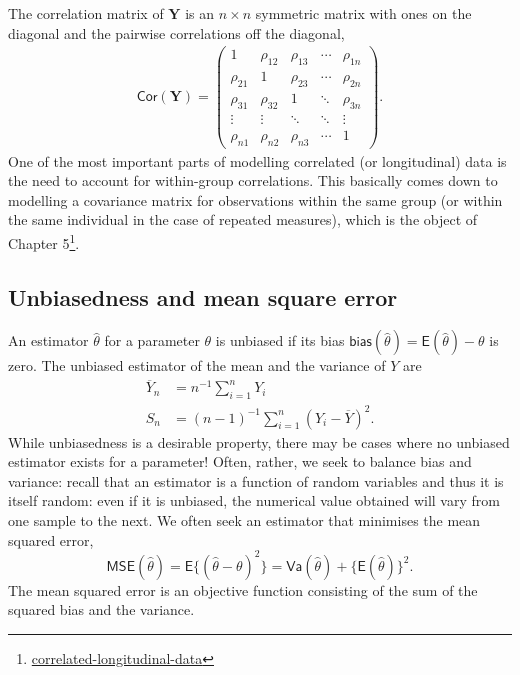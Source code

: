 \documentclass[
  11pt,
  letterpaper,
]{book}
\renewcommand{\href}[2]{#2\footnote{\url{#1}}}
\theoremstyle{definition}
\theoremstyle{definition}
\theoremstyle{definition}
\theoremstyle{remark}
\begin{document}
The correlation matrix of \(\boldsymbol{Y}\) is an
\(n\times n\) symmetric matrix with ones on the diagonal and the pairwise correlations off the diagonal,
\begin{align*}
\mathsf{Cor}(\boldsymbol{Y})=
\begin{pmatrix}
1 & \rho_{12} & \rho_{13} & \cdots & \rho_{1n}\\
\rho_{21} & 1 & \rho_{23} & \cdots & \rho_{2n} \\
\rho_{31} & \rho_{32} & 1 & \ddots & \rho_{3n} \\
\vdots & \vdots & \ddots & \ddots & \vdots \\
\rho_{n1} & \rho_{n2} & \rho_{n3} & \cdots & 1
\end{pmatrix}.
\end{align*}
One of the most important parts of modelling
correlated (or longitudinal) data is the need to account for within-group correlations. This basically comes down to modelling a covariance matrix for observations within the same group (or within the same individual in the case of repeated measures), which is the object of \href{correlated-longitudinal-data}{Chapter 5}.

\hypertarget{unbiasedness-and-mean-square-error}{%
\subsection{Unbiasedness and mean square error}\label{unbiasedness-and-mean-square-error}}

An estimator \(\hat{\theta}\) for a parameter \(\theta\) is unbiased if its bias \(\mathsf{bias}(\hat{\theta})=\mathsf{E}(\hat{\theta})- \theta\) is zero.
The unbiased estimator of the mean and the variance of \(Y\) are
\begin{align*}
\overline{Y}_n &= n^{-1} \sum_{i=1}^n Y_i\\
S_n &= (n-1)^{-1} \sum_{i=1}^n (Y_i-\overline{Y})^2.
\end{align*}
While unbiasedness is a desirable property, there may be cases where no unbiased estimator exists for a parameter! Often, rather, we seek to balance bias and variance: recall that an estimator is a function of random variables and thus it is itself random: even if it is unbiased, the numerical value obtained will vary from one sample to the next. We often seek an estimator that minimises the mean squared error, \[\mathsf{MSE}(\hat{\theta}) = \mathsf{E}\{(\hat{\theta}-\theta)^2\}=\mathsf{Va}(\hat{\theta}) + \{\mathsf{E}(\hat{\theta})\}^2.\]
The mean squared error is an objective function consisting of the sum of the squared bias and the variance.
\end{document}
